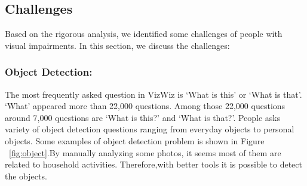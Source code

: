 \documentclass[sigconf]{acmart}
\begin{document}
\subsection{Challenges}
Based on the rigorous analysis, we identified some challenges of people with visual impairments. In this section, we discuss the challenges:

\subsubsection{Object Detection:} The most frequently asked question in VizWiz is `What is this' or `What is that'. `What' appeared more than 22,000 questions. Among those 22,000 questions around 7,000 questions are `What is this?' and `What is that?'. People asks variety of object detection questions ranging from everyday objects to personal objects. Some examples of  object detection problem is shown in Figure ~\ref{fig:object}.By manually analyzing some photos, it seems most of them are related to household activities. Therefore,with better tools it is possible to detect the objects. 
\end{document}

